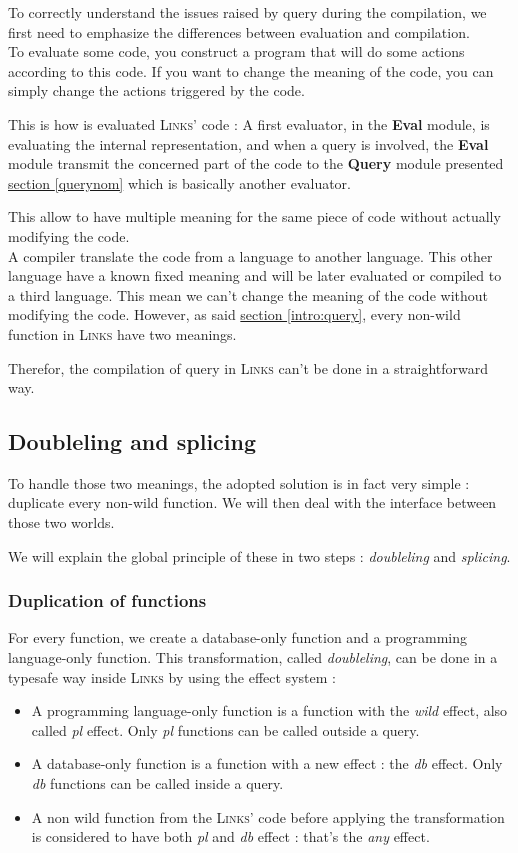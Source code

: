 \documentclass[11pt]{article}
\newcommand\mysc[1]{{\rmfamily\textsc{#1}}\xspace}
\newcommand\links{\mysc{Links}}
\newcommand\refsec[1]{\hyperref[#1]{section \ref*{#1}}}
\newcommand\effect[1]{{\em #1}}
\newcommand\module[1]{{\bf #1}}
\begin{document}
To correctly understand the issues raised by query during the compilation, we first need to emphasize the differences between evaluation and compilation. \\

To evaluate some code, you construct a program that will do some actions according to this code. If you want to change the meaning of the code, you can simply change the actions triggered by the code. 

This is how is evaluated \links' code : A first evaluator, in the \module{Eval} module, is evaluating the internal representation, and when a query is involved, the \module{Eval} module transmit the concerned part of the code to the \module{Query} module presented \refsec{querynom} which is basically another evaluator.

This allow to have multiple meaning for the same piece of code without actually modifying the code.\\

A compiler translate the code from a language to another language. This other language have a known fixed meaning and will be later evaluated or compiled to a third language. This mean we can't change the meaning of the code without modifying the code. However, as said \refsec{intro:query}, every non-wild function in \links have two meanings.

Therefor, the compilation of query in \links can't be done in a straightforward way.

\subsection{Doubleling and splicing}

To handle those two meanings, the adopted solution is in fact very simple : duplicate every non-wild function. We will then deal with the interface between those two worlds.

We will explain the global principle of these in two steps : \emph{doubleling} and \emph{splicing}.

\subsubsection{Duplication of functions}

For every function, we create a database-only function and a programming language-only function. This transformation, called \emph{doubleling}, can be done in a typesafe way inside \links by using the effect system : 
\begin{itemize}
\item A programming language-only function is a function with the \effect{wild} effect, also called \effect{pl} effect. Only \effect{pl} functions can be called outside a query.
\item A database-only function is a function with a new effect : the \effect{db} effect. Only \effect{db} functions can be called inside a query.
\item A non wild function from the \links' code before applying the transformation is considered to have both \effect{pl} and \effect{db} effect : that's the \effect{any} effect.
\end{itemize}
\end{document}
